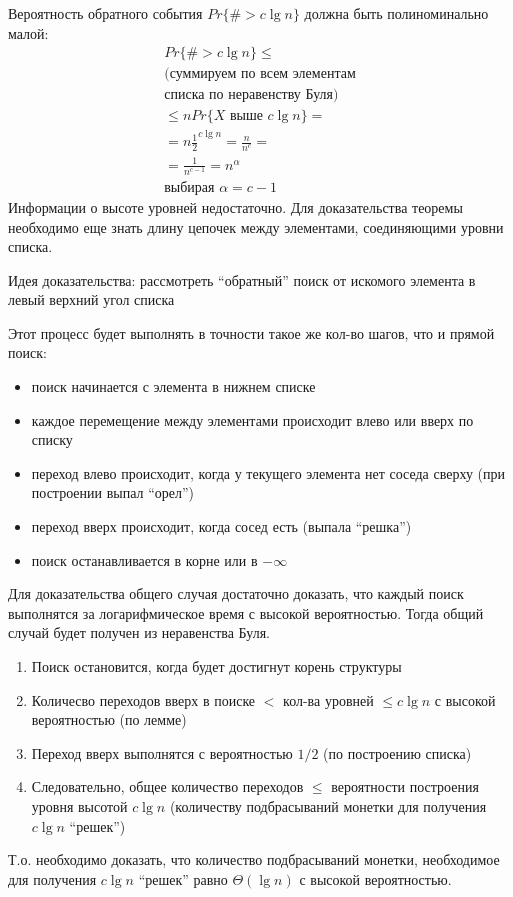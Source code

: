 \documentclass[11pt]{article}
\begin{document}
Вероятность обратного события $Pr\{\# > c\lg n\}$ должна быть полиноминально малой:
\begin{align*}
  Pr\{\# > c \lg n \} \leqslant \\
  \text{(суммируем по всем элементам} \\
  \text{списка по неравенству Буля)} \\
  \leqslant n Pr\{X \text{ выше }c \lg n\} = \\
  = n {\frac{1}{2}}^{c\lg n} = \frac{n}{n^c} = \\
  = \frac{1}{n^{c-1}} = n^\alpha \\
  \text{выбирая }\alpha = c-1
\end{align*}
Информации о высоте уровней недостаточно. Для доказательства теоремы необходимо еще знать длину цепочек между элементами, соединяющими уровни списка.

Идея доказательства: рассмотреть ``обратный'' поиск от искомого элемента в левый верхний угол списка

Этот процесс будет выполнять в точности такое же кол-во шагов, что и прямой поиск:
\begin{itemize}
\item поиск начинается с элемента в нижнем списке
\item каждое перемещение между элементами происходит влево или вверх по списку
\item переход влево происходит, когда у текущего элемента нет соседа сверху (при построении выпал ``орел'')
\item переход вверх происходит, когда сосед есть (выпала ``решка'')
\item поиск останавливается в корне или в $-\infty$
\end{itemize}
Для доказательства общего случая достаточно доказать, что каждый поиск выполнятся за логарифмическое время с высокой вероятностью. Тогда общий случай будет получен из неравенства Буля.
\begin{enumerate}
\item Поиск остановится, когда будет достигнут корень структуры
\item Количесво переходов вверх в поиске $<$ кол-ва уровней $\leqslant c \lg n$ с высокой вероятностью (по лемме)
\item Переход вверх выполнятся с вероятностью $1/2$ (по построению списка)
\item Следовательно, общее количество переходов $\leqslant$ вероятности построения уровня высотой $c \lg n$ (количеству подбрасываний монетки для получения $c \lg n$ ``решек'')
\end{enumerate}
Т.о. необходимо доказать, что количество подбрасываний монетки, необходимое для получения $c \lg n$ ``решек'' равно $\Theta(\lg n)$ с высокой вероятностью.
\end{document}
